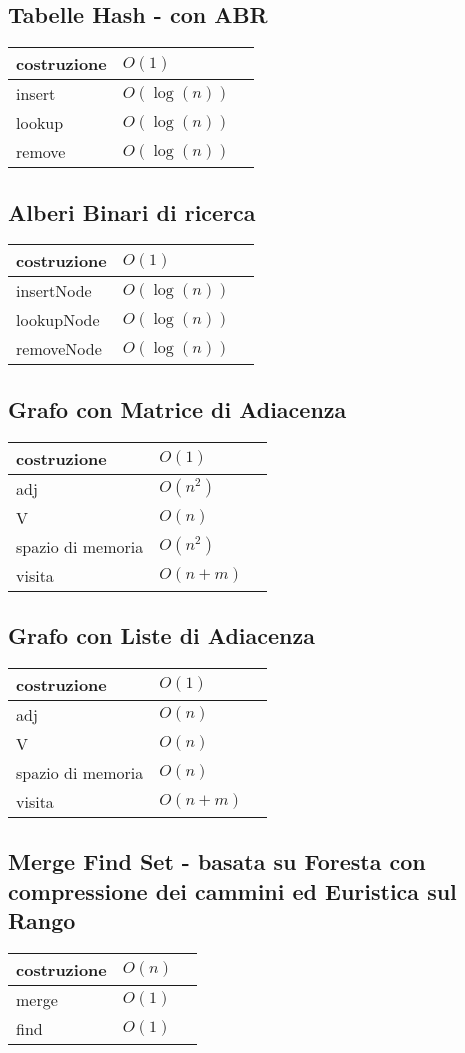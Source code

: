 \documentclass[12pt]{article}
\begin{document}
\subsection*{Tabelle Hash - con ABR}
\begin{tabularx}{\textwidth}{ p{6cm} p{2.7cm} | X }
    \hline
    	costruzione & $O(1)$ & \\ 
    \hline
		insert & $O(\log(n))$ & \\
	\hline
		lookup & $O(\log(n))$ & \\ 
	\hline
		remove & $O(\log(n))$ & \\
	\hline
\end{tabularx}

\subsection*{Alberi Binari di ricerca}
\begin{tabularx}{\textwidth}{ p{6cm} p{2.7cm} | X }
    \hline
    	costruzione & $O(1)$ & \\ 
    \hline
		insertNode & $O(\log(n))$ & \\
	\hline
		lookupNode & $O(\log(n))$ & \\ 
	\hline
		removeNode & $O(\log(n))$ & \\
	\hline
\end{tabularx}

\newpage
\subsection*{Grafo con Matrice di Adiacenza}
\begin{tabularx}{\textwidth}{ p{6cm} p{2.7cm} | X }
    \hline
    	costruzione & $O(1)$ & \\ 
    \hline
		adj & $O(n^2)$ & \\
	\hline
		V & $O(n)$ & \\ 
	\hline
		spazio di memoria & $O(n^2)$ & \\
	\hline
		visita & $O(n+m)$ & \\
	\hline
\end{tabularx}

\subsection*{Grafo con Liste di Adiacenza}
\begin{tabularx}{\textwidth}{ p{6cm} p{2.7cm} | X }
    \hline
    	costruzione & $O(1)$ & \\ 
    \hline
		adj & $O(n)$ & \\
	\hline
		V & $O(n)$ & \\ 
	\hline
		spazio di memoria & $O(n)$ & \\
	\hline
		visita & $O(n+m)$ & \\
	\hline
\end{tabularx}

\subsection*{Merge Find Set - basata su Foresta con compressione dei cammini ed Euristica sul Rango}
\begin{tabularx}{\textwidth}{ p{6cm} p{2.7cm} | X }
    \hline
    	costruzione & $O(n)$ & \\ 
    \hline
    	merge & $O(1)$ & \\
	\hline
		find & $O(1)$ & \\
	\hline
\end{tabularx}
\end{document}
